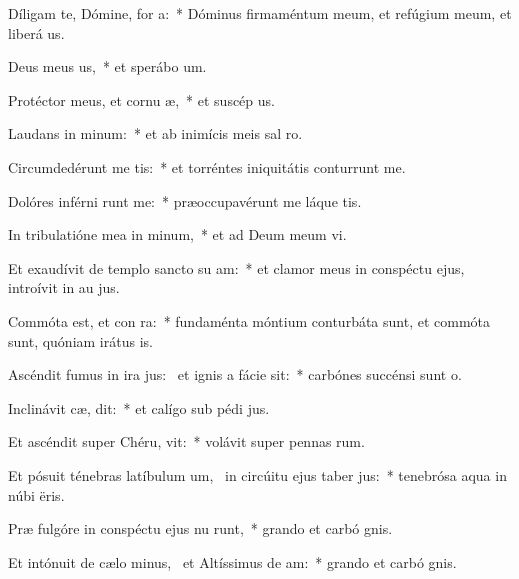 \item Díligam te, Dómine, for a:~* Dóminus firmaméntum meum, et refúgium meum, et liberá us.
\item Deus meus  us,~* et sperábo  um.
\item Protéctor meus, et cornu  æ,~* et suscép us.
\item Laudans in minum:~* et ab inimícis meis sal ro.
\item Circumdedérunt me  tis:~* et torréntes iniquitátis conturrunt me.
\item Dolóres inférni runt me:~* præoccupavérunt me láque tis.
\item In tribulatióne mea in minum,~* et ad Deum meum vi.
\item Et exaudívit de templo sancto su  am:~* et clamor meus in conspéctu ejus, introívit in au jus.
\item Commóta est, et con ra:~* fundaménta móntium conturbáta sunt, et commóta sunt, quóniam irátus  is.
\item Ascéndit fumus in ira jus:~\pscross{} et ignis a fácie  sit:~* carbónes succénsi sunt  o.
\item Inclinávit cæ,  dit:~* et calígo sub pédi jus.
\item Et ascéndit super Chéru,  vit:~* volávit super pennas rum.
\item Et pósuit ténebras latíbulum um,~\pscross{} in circúitu ejus taber jus:~* tenebrósa aqua in núbi ëris.
\item Præ fulgóre in conspéctu ejus nu runt,~* grando et carbó gnis.
\item Et intónuit de cælo minus,~\pscross{} et Altíssimus de  am:~* grando et carbó gnis.
